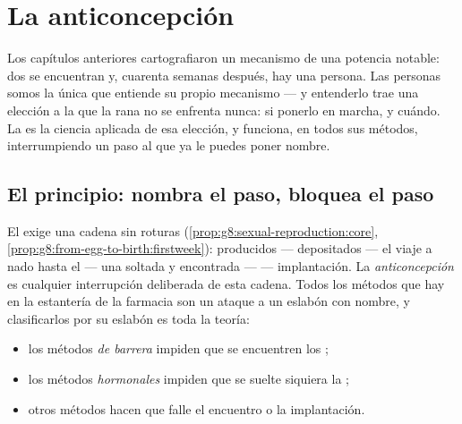 \chapter{La anticoncepción}\label{ch:g8:contraception}

Los capítulos anteriores cartografiaron un mecanismo de una potencia
notable: dos  se encuentran y, cuarenta semanas después, hay una
persona. Las personas somos la única  que entiende su propio
mecanismo --- y entenderlo trae una elección a la que la rana no se
enfrenta nunca: si ponerlo en marcha, y cuándo. La
\emph{} es la ciencia aplicada de esa elección, y
funciona, en todos sus métodos, interrumpiendo un paso al que ya le
puedes poner nombre.

\section{El principio: nombra el paso, bloquea el paso}

\begin{proposition}\label{prop:g8:contraception:principle}
El  exige una cadena sin roturas
(\cref{prop:g8:sexual-reproduction:core},
\cref{prop:g8:from-egg-to-birth:firstweek}):  producidos ---
 depositados --- el viaje a nado hasta el  ---
una   soltada y encontrada ---  ---
implantación. La \emph{anticoncepción} es
cualquier interrupción deliberada de esta cadena. Todos los métodos que
hay en la estantería de la farmacia son un ataque a un eslabón con
nombre, y clasificarlos por su eslabón es toda la teoría:
\begin{itemize}
  \item los métodos \emph{de barrera} impiden que se encuentren los
        ;
  \item los métodos \emph{hormonales} impiden que se suelte siquiera la
         ;
  \item otros métodos hacen que falle el encuentro o la implantación.
\end{itemize}
\end{proposition}
\admitted

